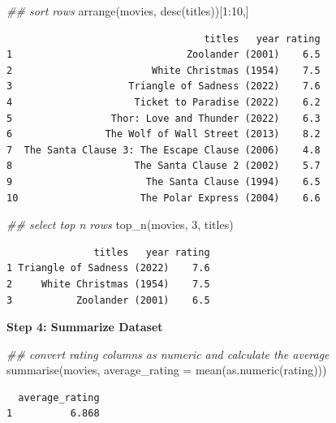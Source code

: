 \documentclass[
  letterpaper,
  DIV=11,
  numbers=noendperiod]{scrreprt}
\newenvironment{Shaded}{\begin{snugshade}}{\end{snugshade}}
\newcommand{\AttributeTok}[1]{\textcolor[rgb]{0.40,0.45,0.13}{#1}}
\newcommand{\DecValTok}[1]{\textcolor[rgb]{0.68,0.00,0.00}{#1}}
\newcommand{\DocumentationTok}[1]{\textcolor[rgb]{0.37,0.37,0.37}{\textit{#1}}}
\newcommand{\FunctionTok}[1]{\textcolor[rgb]{0.28,0.35,0.67}{#1}}
\newcommand{\NormalTok}[1]{\textcolor[rgb]{0.00,0.23,0.31}{#1}}
\newcommand{\SpecialCharTok}[1]{\textcolor[rgb]{0.37,0.37,0.37}{#1}}
\begin{document}
\begin{Shaded}
\begin{Highlighting}[]
\DocumentationTok{\#\# sort rows}
\FunctionTok{arrange}\NormalTok{(movies, }\FunctionTok{desc}\NormalTok{(titles))[}\DecValTok{1}\SpecialCharTok{:}\DecValTok{10}\NormalTok{,]}
\end{Highlighting}
\end{Shaded}

\begin{verbatim}
                                  titles   year rating
1                              Zoolander (2001)    6.5
2                        White Christmas (1954)    7.5
3                    Triangle of Sadness (2022)    7.6
4                     Ticket to Paradise (2022)    6.2
5                 Thor: Love and Thunder (2022)    6.3
6                The Wolf of Wall Street (2013)    8.2
7  The Santa Clause 3: The Escape Clause (2006)    4.8
8                     The Santa Clause 2 (2002)    5.7
9                       The Santa Clause (1994)    6.5
10                     The Polar Express (2004)    6.6
\end{verbatim}

\begin{Shaded}
\begin{Highlighting}[]
\DocumentationTok{\#\# select top n rows}
\FunctionTok{top\_n}\NormalTok{(movies, }\DecValTok{3}\NormalTok{, titles)}
\end{Highlighting}
\end{Shaded}

\begin{verbatim}
               titles   year rating
1 Triangle of Sadness (2022)    7.6
2     White Christmas (1954)    7.5
3           Zoolander (2001)    6.5
\end{verbatim}

\textbf{Step 4: Summarize Dataset}

\begin{Shaded}
\begin{Highlighting}[]
\DocumentationTok{\#\# convert rating columns as numeric and calculate the average}
\FunctionTok{summarise}\NormalTok{(movies, }\AttributeTok{average\_rating =} \FunctionTok{mean}\NormalTok{(}\FunctionTok{as.numeric}\NormalTok{(rating)))}
\end{Highlighting}
\end{Shaded}

\begin{verbatim}
  average_rating
1          6.868
\end{verbatim}
\end{document}

